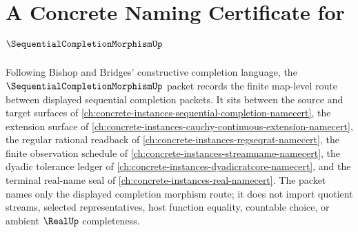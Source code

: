 \chapter{A Concrete Naming Certificate for $\SequentialCompletionMorphismUp$}
\label{ch:concrete-instances-sequential-completion-morphism-namecert}

Following Bishop and Bridges' constructive completion language, the $\SequentialCompletionMorphismUp$ packet records the finite map-level route between displayed sequential completion packets. It sits between the source and target surfaces of \autoref{ch:concrete-instances-sequential-completion-namecert}, the extension surface of \autoref{ch:concrete-instances-cauchy-continuous-extension-namecert}, the regular rational readback of \autoref{ch:concrete-instances-regseqrat-namecert}, the finite observation schedule of \autoref{ch:concrete-instances-streamname-namecert}, the dyadic tolerance ledger of \autoref{ch:concrete-instances-dyadicratcore-namecert}, and the terminal real-name seal of \autoref{ch:concrete-instances-real-namecert}. The packet names only the displayed completion morphism route; it does not import quotient streams, selected representatives, host function equality, countable choice, or ambient $\RealUp$ completeness.

